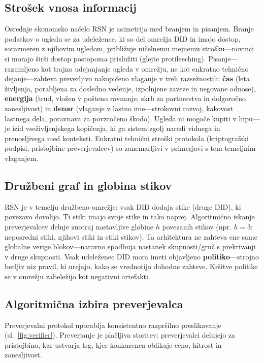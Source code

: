 \documentclass[11pt,a4paper,twocolumn]{article}
\begin{document}
\subsection{Strošek vnosa informacij}

Osrednje ekonomsko načelo RSN je asimetrija med branjem in pisanjem. Branje podatkov o ugledu se za udeležence, ki so del omrežja DID in imajo dostop, sorazmeren z njihovim ugledom, približuje ničelnemu mejnemu strošku---novinci si morajo širši dostop postopoma prislužiti (glejte protileeching). Pisanje---razumljeno kot trajno udejanjanje ugleda v omrežju, ne kot enkratno tehnično dejanje---zahteva preverljivo nakopičeno vlaganje v treh razsežnostih: \textbf{čas} (leta življenja, porabljena za dosledno vedenje, izpolnjene zaveze in negovane odnose), \textbf{energija} (trud, vložen v pošteno ravnanje, skrb za partnerstva in dolgoročno zanesljivost) in \textbf{denar} (vlaganje v lastno ime---strokovni razvoj, kakovost lastnega dela, poravnava za povzročeno škodo). Ugleda ni mogoče kupiti v hipu---je izid vseživljenjskega kopičenja, ki ga sistem zgolj naredi vidnega in prenosljivega med konteksti. Enkratni tehnični stroški protokola (kriptografski podpisi, pristojbine preverjevalcev) so zanemarljivi v primerjavi s tem temeljnim vlaganjem.

\subsection{Družbeni graf in globina stikov}

RSN je v temelju družbeno omrežje: vsak DID dodaja stike (druge DID), ki povezavo dovolijo. Ti stiki imajo svoje stike in tako naprej. Algoritmično iskanje preverjevalcev deluje znotraj nastavljive globine $h$ povezanih stikov (npr. $h=3$: neposredni stiki, njihovi stiki in stiki stikov). Ta arhitektura ne zahteva ene same globalne verige blokov---naravno spodbuja nastanek skupnosti/gruč s prekrivanji v druge skupnosti. Vsak udeleženec DID mora imeti objavljeno \textbf{politiko}---strojno berljiv niz pravil, ki urejajo, kako se vrednotijo dohodne zahteve. Kršitve politike se v omrežju zabeležijo kot negativni artefakti.

\subsection{Algoritmična izbira preverjevalca}

Preverjevalni protokol uporablja konsistentno razpršilno preslikavanje~\cite{karger1997} (sl.~\ref{fig:verifier}). Preverjanje je plačljiva storitev: preverjevalci delujejo za pristojbino, kar ustvarja trg, kjer konkurenca oblikuje ceno, hitrost in zanesljivost.
\end{document}
